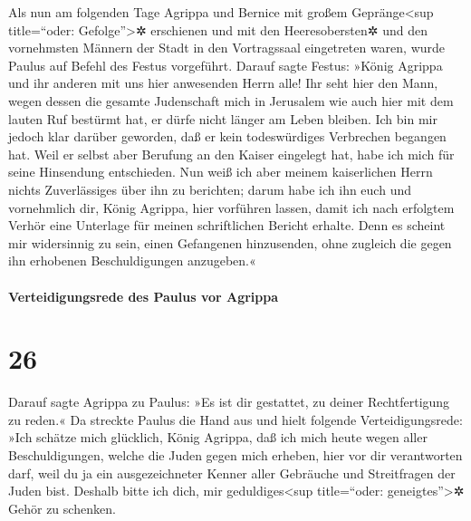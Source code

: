  Als nun am folgenden Tage Agrippa und Bernice mit großem
Gepränge\textless sup title=``oder: Gefolge''\textgreater✲ erschienen
und mit den Heeresobersten✲ und den vornehmsten Männern der Stadt in den
Vortragssaal eingetreten waren, wurde Paulus auf Befehl des Festus
vorgeführt.  Darauf sagte Festus: »König Agrippa und ihr
anderen mit uns hier anwesenden Herrn alle! Ihr seht hier den Mann,
wegen dessen die gesamte Judenschaft mich in Jerusalem wie auch hier mit
dem lauten Ruf bestürmt hat, er dürfe nicht länger am Leben bleiben.
 Ich bin mir jedoch klar darüber geworden, daß er kein
todeswürdiges Verbrechen begangen hat. Weil er selbst aber Berufung an
den Kaiser eingelegt hat, habe ich mich für seine Hinsendung
entschieden.  Nun weiß ich aber meinem kaiserlichen Herrn
nichts Zuverlässiges über ihn zu berichten; darum habe ich ihn euch und
vornehmlich dir, König Agrippa, hier vorführen lassen, damit ich nach
erfolgtem Verhör eine Unterlage für meinen schriftlichen Bericht
erhalte.  Denn es scheint mir widersinnig zu sein, einen
Gefangenen hinzusenden, ohne zugleich die gegen ihn erhobenen
Beschuldigungen anzugeben.«

\hypertarget{verteidigungsrede-des-paulus-vor-agrippa}{%
\paragraph{Verteidigungsrede des Paulus vor
Agrippa}\label{verteidigungsrede-des-paulus-vor-agrippa}}

\hypertarget{section-25}{%
\section{26}\label{section-25}}

 Darauf sagte Agrippa zu Paulus: »Es ist dir gestattet, zu
deiner Rechtfertigung zu reden.« Da streckte Paulus die Hand aus und
hielt folgende Verteidigungsrede:  »Ich schätze mich
glücklich, König Agrippa, daß ich mich heute wegen aller
Beschuldigungen, welche die Juden gegen mich erheben, hier vor dir
verantworten darf,  weil du ja ein ausgezeichneter Kenner
aller Gebräuche und Streitfragen der Juden bist. Deshalb bitte ich dich,
mir geduldiges\textless sup title=``oder: geneigtes''\textgreater✲ Gehör
zu schenken.

